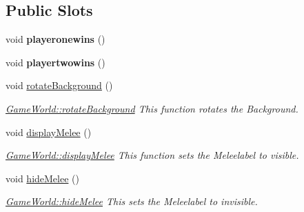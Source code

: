 \subsection*{Public Slots}
\begin{DoxyCompactItemize}
\item 
void {\bfseries playeronewins} ()\hypertarget{class_game_world_ada24b43c2a2c6d8147f2054a1e4a71c0}{}\label{class_game_world_ada24b43c2a2c6d8147f2054a1e4a71c0}

\item 
void {\bfseries playertwowins} ()\hypertarget{class_game_world_a6a0c32cf4eea04374ea6c4ec75ed3737}{}\label{class_game_world_a6a0c32cf4eea04374ea6c4ec75ed3737}

\item 
void \hyperlink{class_game_world_a4b17ac101198095db71b34cfd87b97b2}{rotate\+Background} ()\hypertarget{class_game_world_a4b17ac101198095db71b34cfd87b97b2}{}\label{class_game_world_a4b17ac101198095db71b34cfd87b97b2}

\begin{DoxyCompactList}\small\item\em \hyperlink{class_game_world_a4b17ac101198095db71b34cfd87b97b2}{Game\+World\+::rotate\+Background} This function rotates the Background. \end{DoxyCompactList}\item 
void \hyperlink{class_game_world_a5c708aa7aed621ce59bf8040422d6bf0}{display\+Melee} ()\hypertarget{class_game_world_a5c708aa7aed621ce59bf8040422d6bf0}{}\label{class_game_world_a5c708aa7aed621ce59bf8040422d6bf0}

\begin{DoxyCompactList}\small\item\em \hyperlink{class_game_world_a5c708aa7aed621ce59bf8040422d6bf0}{Game\+World\+::display\+Melee} This function sets the Meleelabel to visible. \end{DoxyCompactList}\item 
void \hyperlink{class_game_world_ad8dd31d4ac368bda6d54b3d5398ed3ea}{hide\+Melee} ()\hypertarget{class_game_world_ad8dd31d4ac368bda6d54b3d5398ed3ea}{}\label{class_game_world_ad8dd31d4ac368bda6d54b3d5398ed3ea}

\begin{DoxyCompactList}\small\item\em \hyperlink{class_game_world_ad8dd31d4ac368bda6d54b3d5398ed3ea}{Game\+World\+::hide\+Melee} This sets the Meleelabel to invisible. \end{DoxyCompactList}\end{DoxyCompactItemize}
